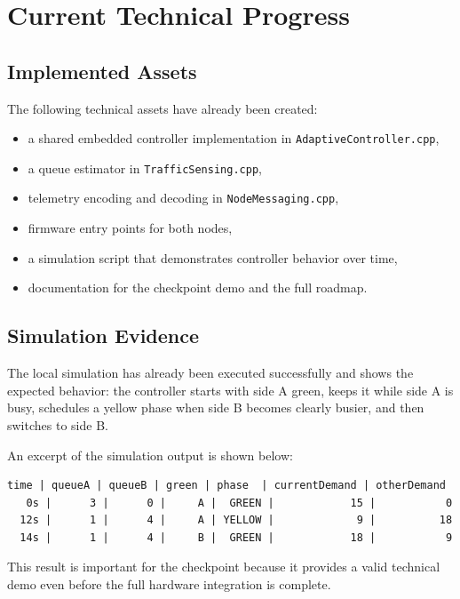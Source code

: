\documentclass[11pt,a4paper]{article}
\begin{document}
\section{Current Technical Progress}

\subsection{Implemented Assets}

The following technical assets have already been created:

\begin{itemize}
    \item a shared embedded controller implementation in \texttt{AdaptiveController.cpp},
    \item a queue estimator in \texttt{TrafficSensing.cpp},
    \item telemetry encoding and decoding in \texttt{NodeMessaging.cpp},
    \item firmware entry points for both nodes,
    \item a simulation script that demonstrates controller behavior over time,
    \item documentation for the checkpoint demo and the full roadmap.
\end{itemize}

\subsection{Simulation Evidence}

The local simulation has already been executed successfully and shows the expected behavior: the controller starts with side A green, keeps it while side A is busy, schedules a yellow phase when side B becomes clearly busier, and then switches to side B.

An excerpt of the simulation output is shown below:

\begin{lstlisting}
time | queueA | queueB | green | phase  | currentDemand | otherDemand
   0s |      3 |      0 |     A |  GREEN |            15 |           0
  12s |      1 |      4 |     A | YELLOW |             9 |          18
  14s |      1 |      4 |     B |  GREEN |            18 |           9
\end{lstlisting}

This result is important for the checkpoint because it provides a valid technical demo even before the full hardware integration is complete.
\end{document}
